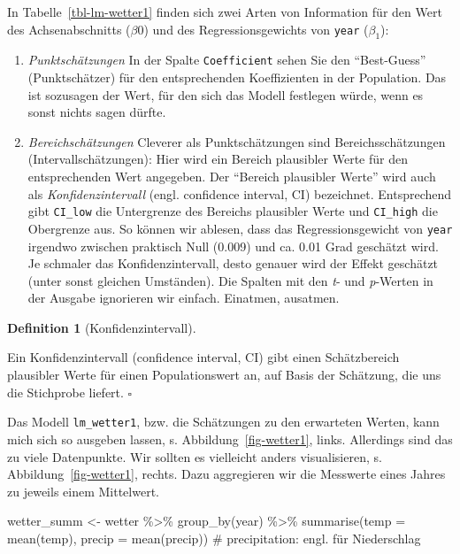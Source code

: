 \documentclass[
  letterpaper,
  twoside,
  open=any]{scrbook}
\newenvironment{Shaded}{\begin{snugshade}}{\end{snugshade}}
\newcommand{\AttributeTok}[1]{\textcolor[rgb]{0.40,0.45,0.13}{#1}}
\newcommand{\CommentTok}[1]{\textcolor[rgb]{0.37,0.37,0.37}{#1}}
\newcommand{\FunctionTok}[1]{\textcolor[rgb]{0.28,0.35,0.67}{#1}}
\newcommand{\NormalTok}[1]{\textcolor[rgb]{0.00,0.23,0.31}{#1}}
\newcommand{\OtherTok}[1]{\textcolor[rgb]{0.00,0.23,0.31}{#1}}
\newcommand{\SpecialCharTok}[1]{\textcolor[rgb]{0.37,0.37,0.37}{#1}}
\theoremstyle{definition}
\newtheorem{definition}{Definition}[chapter]
\theoremstyle{definition}
\theoremstyle{definition}
\theoremstyle{remark}
\begin{document}
In Tabelle~\ref{tbl-lm-wetter1} finden sich zwei Arten von Information
für den Wert des Achsenabschnitts (\(\beta 0\)) und des
Regressionsgewichts von \texttt{year} (\(\beta _1\)):

\begin{enumerate}
\def\labelenumi{\arabic{enumi}.}
\item
  \emph{Punktschätzungen} In der Spalte \texttt{Coefficient} sehen Sie
  den \enquote{Best-Guess} (Punktschätzer) für den entsprechenden
  Koeffizienten in der Population. Das ist sozusagen der Wert, für den
  sich das Modell festlegen würde, wenn es sonst nichts sagen dürfte.
\item
  \emph{Bereichschätzungen} Cleverer als Punktschätzungen sind
  Bereichsschätzungen (Intervallschätzungen): Hier wird ein Bereich
  plausibler Werte für den entsprechenden Wert angegeben. Der
  \enquote{Bereich plausibler Werte} wird auch als
  \emph{Konfidenzintervall} (engl. confidence interval, CI) bezeichnet.
  Entsprechend gibt \texttt{CI\_low} die Untergrenze des Bereichs
  plausibler Werte und \texttt{CI\_high} die Obergrenze aus. So können
  wir ablesen, dass das Regressionsgewicht von \texttt{year} irgendwo
  zwischen praktisch Null (0.009) und ca. 0.01 Grad geschätzt wird. Je
  schmaler das Konfidenzintervall, desto genauer wird der Effekt
  geschätzt (unter sonst gleichen Umständen). Die Spalten mit den
  \emph{t}- und \emph{p}-Werten in der Ausgabe ignorieren wir einfach.
  Einatmen, ausatmen.
\end{enumerate}

\begin{definition}[Konfidenzintervall]\protect\hypertarget{def-konfidenzintervall}{}\label{def-konfidenzintervall}

Ein Konfidenzintervall (confidence interval, CI) gibt einen
Schätzbereich plausibler Werte für einen Populationswert an, auf Basis
der Schätzung, die uns die Stichprobe liefert. \(\square\)

\end{definition}

Das Modell \texttt{lm\_wetter1}, bzw. die Schätzungen zu den erwarteten
Werten, kann mich sich so ausgeben lassen, s.
Abbildung~\ref{fig-wetter1}, links. Allerdings sind das zu viele
Datenpunkte. Wir sollten es vielleicht anders visualisieren, s.
Abbildung~\ref{fig-wetter1}, rechts. Dazu aggregieren wir die Messwerte
eines Jahres zu jeweils einem Mittelwert.

\begin{Shaded}
\begin{Highlighting}[]
\NormalTok{wetter\_summ }\OtherTok{\textless{}{-}}
\NormalTok{  wetter }\SpecialCharTok{\%\textgreater{}\%} 
  \FunctionTok{group\_by}\NormalTok{(year) }\SpecialCharTok{\%\textgreater{}\%} 
  \FunctionTok{summarise}\NormalTok{(}\AttributeTok{temp =} \FunctionTok{mean}\NormalTok{(temp),}
            \AttributeTok{precip =} \FunctionTok{mean}\NormalTok{(precip))  }\CommentTok{\# precipitation: engl. für Niederschlag}
\end{Highlighting}
\end{Shaded}
\end{document}

